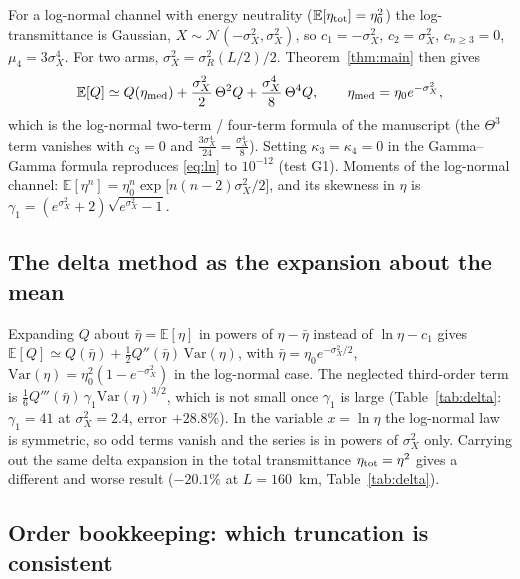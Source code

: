 \documentclass[11pt,a4paper]{article}
\theoremstyle{plain}
\theoremstyle{remark}
\begin{document}
For a log-normal channel with energy neutrality ($\mathbb E[\eta_{\rm tot}]=\eta_0^2$) the log-transmittance is Gaussian, $X\sim\mathcal N(-\sigma_X^2,\sigma_X^2)$, so $c_1=-\sigma_X^2$, $c_2=\sigma_X^2$, $c_{n\ge3}=0$, $\mu_4=3\sigma_X^4$. For two arms, $\sigma_X^2=\sigma_R^2(L/2)/2$. Theorem~\ref{thm:main} then gives
\begin{equation}
  \mathbb E[Q]\simeq Q(\eta_{\rm med})+\frac{\sigma_X^2}{2}\,\Theta^2Q+\frac{\sigma_X^4}{8}\,\Theta^4Q,\qquad \eta_{\rm med}=\eta_0e^{-\sigma_X^2},
  \label{eq:ln}
\end{equation}
which is the log-normal two-term / four-term formula of the manuscript (the $\Theta^3$ term vanishes with $c_3=0$ and $\tfrac{3\sigma_X^4}{24}=\tfrac{\sigma_X^4}{8}$). Setting $\kappa_3=\kappa_4=0$ in the Gamma--Gamma formula reproduces \eqref{eq:ln} to $10^{-12}$ (test G1). Moments of the log-normal channel: $\mathbb E[\eta^n]=\eta_0^n\exp\!\big[n(n-2)\sigma_X^2/2\big]$, and its skewness in $\eta$ is $\gamma_1=(e^{\sigma_X^2}+2)\sqrt{e^{\sigma_X^2}-1}$.

\subsection{The delta method as the expansion about the mean}

Expanding $Q$ about $\bar\eta=\mathbb E[\eta]$ in powers of $\eta-\bar\eta$ instead of $\ln\eta-c_1$ gives
$\mathbb E[Q]\simeq Q(\bar\eta)+\tfrac12Q''(\bar\eta)\,\mathrm{Var}(\eta)$, with $\bar\eta=\eta_0e^{-\sigma_X^2/2}$, $\mathrm{Var}(\eta)=\eta_0^2(1-e^{-\sigma_X^2})$ in the log-normal case. The neglected third-order term is $\tfrac16Q'''(\bar\eta)\,\gamma_1\mathrm{Var}(\eta)^{3/2}$, which is not small once $\gamma_1$ is large (Table~\ref{tab:delta}: $\gamma_1=41$ at $\sigma_X^2=2.4$, error $+28.8\%$). In the variable $x=\ln\eta$ the log-normal law is symmetric, so odd terms vanish and the series is in powers of $\sigma_X^2$ only. Carrying out the same delta expansion in the total transmittance $\eta_{\rm tot}=\eta^2$ gives a different and worse result ($-20.1\%$ at $L=160$~km, Table~\ref{tab:delta}).

\subsection{Order bookkeeping: which truncation is consistent}
\label{sec:order}
\end{document}
